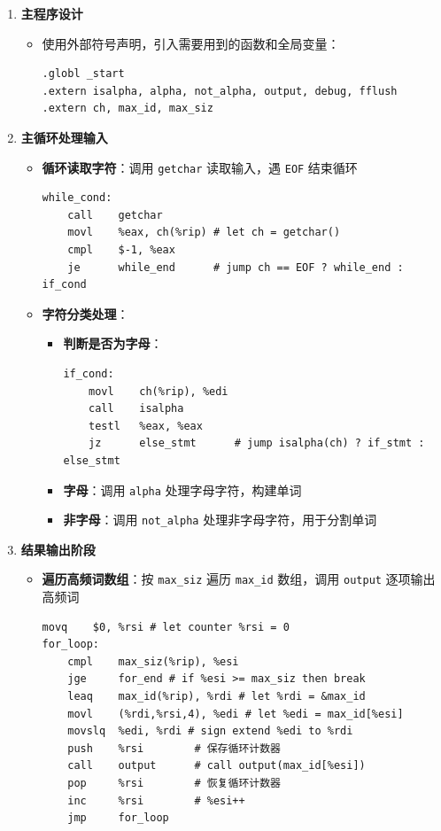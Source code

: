 \documentclass[10pt,a4paper]{article}
\begin{document}
\begin{enumerate}
    \item \textbf{主程序设计}
    \begin{itemize}
        \item 使用外部符号声明，引入需要用到的函数和全局变量：
        \begin{lstlisting}[language={[x86masm]Assembler}]
.globl _start
.extern isalpha, alpha, not_alpha, output, debug, fflush
.extern ch, max_id, max_siz
        \end{lstlisting}
    \end{itemize}
    
    \item \textbf{主循环处理输入}
    \begin{itemize}
        \item \textbf{循环读取字符}：调用 \verb|getchar| 读取输入，遇 \verb|EOF| 结束循环
        \begin{lstlisting}[language={[x86masm]Assembler}]
while_cond:
    call    getchar
    movl    %eax, ch(%rip) # let ch = getchar()
    cmpl    $-1, %eax
    je      while_end      # jump ch == EOF ? while_end : if_cond
        \end{lstlisting}
        
        \item \textbf{字符分类处理}：
        \begin{itemize}
            \item \textbf{判断是否为字母}：
            \begin{lstlisting}[language={[x86masm]Assembler}]
if_cond:
    movl    ch(%rip), %edi
    call    isalpha
    testl   %eax, %eax
    jz      else_stmt      # jump isalpha(ch) ? if_stmt : else_stmt
            \end{lstlisting}
            
            \item \textbf{字母}：调用 \verb|alpha| 处理字母字符，构建单词
            \item \textbf{非字母}：调用 \verb|not_alpha| 处理非字母字符，用于分割单词
        \end{itemize}
    \end{itemize}
    
    \item \textbf{结果输出阶段}
    \begin{itemize}
        \item \textbf{遍历高频词数组}：按 \verb|max_siz| 遍历 \verb|max_id| 数组，调用 \verb|output| 逐项输出高频词
        \begin{lstlisting}[language={[x86masm]Assembler}]
    movq    $0, %rsi # let counter %rsi = 0
for_loop:
    cmpl    max_siz(%rip), %esi
    jge     for_end # if %esi >= max_siz then break
    leaq    max_id(%rip), %rdi # let %rdi = &max_id
    movl    (%rdi,%rsi,4), %edi # let %edi = max_id[%esi]
    movslq  %edi, %rdi # sign extend %edi to %rdi
    push    %rsi        # 保存循环计数器
    call    output      # call output(max_id[%esi])
    pop     %rsi        # 恢复循环计数器
    inc     %rsi        # %esi++
    jmp     for_loop
        \end{lstlisting}
    \end{itemize}
    

\end{enumerate}
\end{document}
